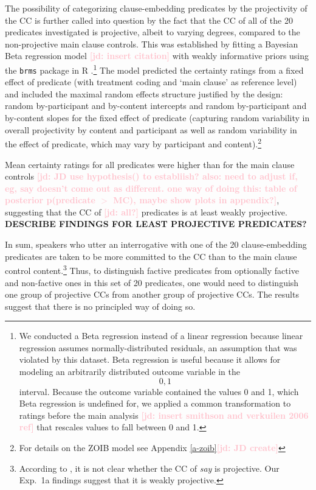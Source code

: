 \documentclass[11pt,fleqn]{article}
\newcommand{\jd}[1]{\textbf{\textcolor{Pink}{[jd: #1]}}}
\newcommand{\6}{\mbox{$[\hspace*{-.6mm}[$}}
\newcommand{\9}{\mbox{$]\hspace*{-.6mm}]$}}
\begin{document}
The possibility of categorizing clause-embedding predicates by the projectivity of the CC is further called into question by the fact that the CC of all of the 20 predicates investigated is projective, albeit to varying degrees, compared to the non-projective main clause controls. This was established by fitting a Bayesian Beta regression model \jd{insert citation} with weakly informative priors using the \verb|brms| \citep{buerkner2017}  package in R \citep{R}.\footnote{We conducted a Beta regression instead of a linear regression because linear regression assumes normally-distributed residuals, an assumption that was violated by this dataset. Beta regression is useful because it allows for modeling an arbitrarily distributed outcome variable in the \[0,1\] interval. Because the outcome variable contained the values 0 and 1, which Beta regression is undefined for, we applied a common transformation to ratings before the main analysis \jd{insert smithson and verkuilen 2006 ref} that rescales values to fall between 0 and 1.} The model predicted the certainty ratings from a fixed effect of predicate (with treatment coding and `main clause' as  reference level) and included the maximal random effects structure justified by the design: random by-participant and by-content intercepts and random by-participant and by-content slopes for the fixed effect of predicate (capturing random variability in overall projectivity by content and participant as well as random variability in the effect of predicate, which may vary by participant and content).\footnote{For details on the ZOIB model see Appendix \ref{a-zoib}\jd{JD create}} 

Mean certainty ratings for all predicates were higher than for the main clause controls \jd{JD use hypothesis() to establiish? also: need to adjust if, eg, say doesn't come out as different. one way of doing this: table of posterior p(predicate $>$ MC), maybe show plots in appendix?}, suggesting that the CC of \jd{all?} predicates is at least weakly projective.  {\bf DESCRIBE FINDINGS FOR LEAST PROJECTIVE PREDICATES?} 

In sum, speakers who utter an interrogative with one of the 20 clause-embedding predicates are taken to be more committed to the CC than to the main clause control content.\footnote{According to \citet[1739]{spector-egre2015}, it is not clear whether the CC of {\em say} is projective. Our Exp.~1a findings suggest that it is weakly projective.}    Thus, to distinguish factive predicates from optionally factive and non-factive ones in this set of 20 predicates, one would need to distinguish one group of projective CCs from another group of projective CCs. The results suggest that there is no principled way of doing so.
\end{document}
